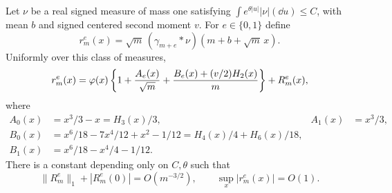 \documentclass[11pt,a4paper]{article}
\theoremstyle{remark}\newtheorem*{ednote}{Editorial note (ProveIt, 2026-10-01)}
\begin{document}
\begin{lemma}\label{lem:gamma}
Let $\nu$ be a real signed measure of mass one satisfying
$\int e^{\theta|u|}|\nu|(\dd u)\le C$, with mean $b$ and signed centered second moment $v$. For $e\in\{0,1\}$ define
\[
 r_m^e(x)=\sqrt m\,(\gamma_{m+e}*\nu)(m+b+\sqrt m\,x).
\]
Uniformly over this class of measures,
\begin{equation}\label{eq:gammaexp}
 r_m^e(x)=\varphi(x)\left\{1+\frac{A_e(x)}{\sqrt m}
                  +\frac{B_e(x)+(v/2)H_2(x)}m\right\}+R_m^e(x),
\end{equation}
where
\begin{align*}
 A_0(x)&=x^3/3-x=H_3(x)/3,&A_1(x)&=x^3/3,\\
 B_0(x)&=x^6/18-7x^4/12+x^2-1/12
             =H_4(x)/4+H_6(x)/18,\\
 B_1(x)&=x^6/18-x^4/4-1/12.
\end{align*}
There is a constant depending only on $C,\theta$ such that
\begin{equation}\label{eq:gammaerror}
 \|R_m^e\|_1+|R_m^e(0)|=O(m^{-3/2}),\qquad
 \sup_x|r_m^e(x)|=O(1).
\end{equation}
\end{lemma}
\end{document}
